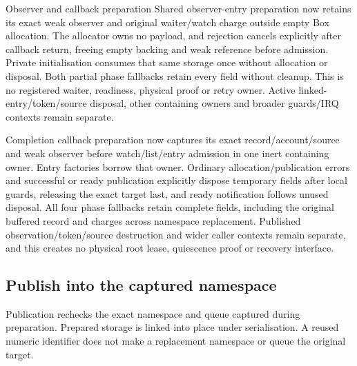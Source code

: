 \begin{implementationdetail}{Observer and callback preparation}
Shared observer-entry preparation now retains its exact weak observer and
original waiter/watch charge outside empty Box allocation. The allocator owns
no payload, and rejection cancels explicitly after callback return, freeing empty
backing and weak reference before admission. Private initialisation consumes
that same storage once without allocation or disposal. Both partial phase
fallbacks retain every field without cleanup. This is no registered waiter,
readiness, physical proof or retry owner. Active linked-entry/token/source disposal,
other containing owners and broader guards/IRQ contexts remain separate.

Completion callback preparation now captures its exact record/account/source
and weak observer before watch/list/entry admission in one inert containing
owner. Entry factories borrow that owner. Ordinary allocation/publication errors
and successful or ready publication explicitly dispose temporary fields after
local guards, releasing the exact target last, and ready notification follows
unused disposal. All four phase fallbacks retain complete fields, including the
original buffered record and charges across namespace replacement. Published
observation/token/source destruction and wider caller contexts remain separate, and
this creates no physical root lease, quiescence proof or recovery interface.
\end{implementationdetail}

\subsection{Publish into the captured namespace}

Publication rechecks the exact namespace and queue captured during preparation.
Prepared storage is linked into place under serialisation. A reused numeric
identifier does not make a replacement namespace or queue the original target.

